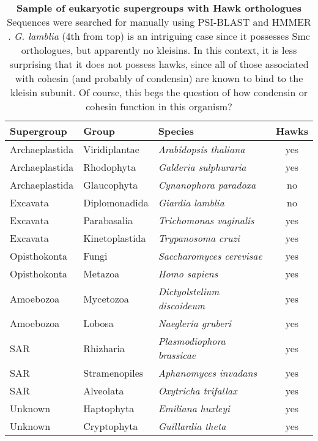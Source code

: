 \documentclass[a4paper,11pt,twoside,openright]{scrbook}
\begin{document}
\begin{table}[h]
    \captionsetup{width=0.85\linewidth}
    \caption[Sample of eukaryotic supergroups with Hawk orthologues]{\sffamily \textbf{Sample of eukaryotic supergroups with Hawk orthologues} \\ \small Sequences were searched for manually using PSI-BLAST and HMMER \cite{Altschul1997,Finn2011}. \textit{G. lamblia} (4th from top) is an intriguing case since it possesses Smc orthologues, but apparently no kleisins. In this context, it is less surprising that it does not possess hawks, since all of those associated with cohesin (and probably of condensin) are known to bind to the kleisin subunit. Of course, this begs the question of how condensin or cohesin function in this organism?}
    \centering
    \onehalfspacing
    \begin{tabular}{l l l c}
    \hline
    Supergroup  & Group   &  Species &   Hawks\\[0.1cm]
    \hline
Archaeplastida &   Viridiplantae  &   \textit{Arabidopsis thaliana}     &  yes\\
Archaeplastida &   Rhodophyta     &   \textit{Galderia sulphuraria}     &  yes\\
Archaeplastida &   Glaucophyta    &   \textit{Cynanophora paradoxa}     &  no\\
Excavata       &   Diplomonadida  &   \textit{Giardia lamblia}          &  no\\
Excavata       &   Parabasalia    &   \textit{Trichomonas vaginalis}    &  yes\\
Excavata       &   Kinetoplastida &   \textit{Trypanosoma cruzi}        &  yes\\
Opisthokonta   &   Fungi          &   \textit{Saccharomyces cerevisae}  &  yes\\
Opisthokonta   &   Metazoa        &   \textit{Homo sapiens}             &  yes\\
Amoebozoa      &   Mycetozoa      &   \textit{Dictyolstelium discoideum}&  yes\\
Amoebozoa      &   Lobosa         &   \textit{Naegleria gruberi}        &  yes\\
SAR            &   Rhizharia      &   \textit{Plasmodiophora brassicae} &  yes\\
SAR            &   Stramenopiles  &   \textit{Aphanomyces invadans}     &  yes\\
SAR            &   Alveolata      &   \textit{Oxytricha trifallax}      &  yes\\
Unknown        &   Haptophyta     &   \textit{Emiliana huxleyi}         &  yes\\
Unknown        &   Cryptophyta    &   \textit{Guillardia theta}         &  yes\\
[0.1cm]
    \hline
    \end{tabular}
    \label{c2t1}
\end{table}
\end{document}
